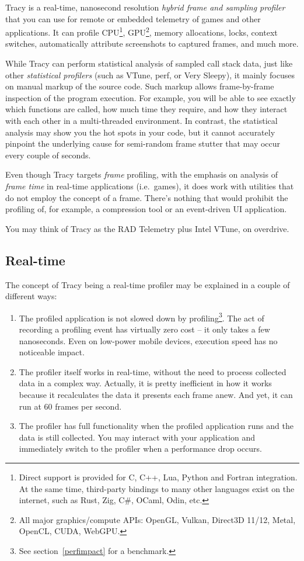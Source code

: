 \documentclass[hidelinks,titlepage,a4paper,twoside]{article}
\begin{document}
Tracy is a real-time, nanosecond resolution \emph{hybrid frame and sampling profiler} that you can use for remote or embedded telemetry of games and other applications. It can profile CPU\footnote{Direct support is provided for C, C++, Lua, Python and Fortran integration. At the same time, third-party bindings to many other languages exist on the internet, such as Rust, Zig, C\#, OCaml, Odin, etc.}, GPU\footnote{All major graphics/compute APIs: OpenGL, Vulkan, Direct3D 11/12, Metal, OpenCL, CUDA, WebGPU.}, memory allocations, locks, context switches, automatically attribute screenshots to captured frames, and much more.

While Tracy can perform statistical analysis of sampled call stack data, just like other \emph{statistical profilers} (such as VTune, perf, or Very Sleepy), it mainly focuses on manual markup of the source code. Such markup allows frame-by-frame inspection of the program execution. For example, you will be able to see exactly which functions are called, how much time they require, and how they interact with each other in a multi-threaded environment. In contrast, the statistical analysis may show you the hot spots in your code, but it cannot accurately pinpoint the underlying cause for semi-random frame stutter that may occur every couple of seconds.

Even though Tracy targets \emph{frame} profiling, with the emphasis on analysis of \emph{frame time} in real-time applications (i.e.~games), it does work with utilities that do not employ the concept of a frame. There's nothing that would prohibit the profiling of, for example, a compression tool or an event-driven UI application.

You may think of Tracy as the RAD Telemetry plus Intel VTune, on overdrive.

\subsection{Real-time}

The concept of Tracy being a real-time profiler may be explained in a couple of different ways:

\begin{enumerate}
\item The profiled application is not slowed down by profiling\footnote{See section~\ref{perfimpact} for a benchmark.}. The act of recording a profiling event has virtually zero cost -- it only takes a few nanoseconds. Even on low-power mobile devices, execution speed has no noticeable impact.
\item The profiler itself works in real-time, without the need to process collected data in a complex way. Actually, it is pretty inefficient in how it works because it recalculates the data it presents each frame anew. And yet, it can run at 60 frames per second.
\item The profiler has full functionality when the profiled application runs and the data is still collected. You may interact with your application and immediately switch to the profiler when a performance drop occurs.
\end{enumerate}
\end{document}
